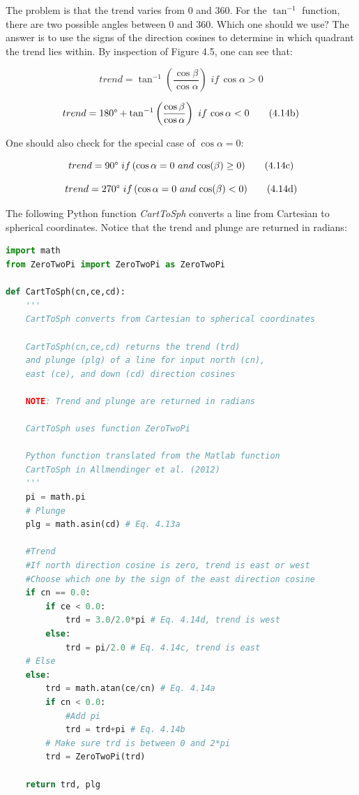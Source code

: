 \documentclass[a4paper , 12pt]{book}
\begin{document}
The problem is that the trend varies from 0 and 360\degree. For the $\tan^{-1}$ function, there are two possible angles between 0 and 360\degree. Which one should we use? The answer is to use the signs of the direction cosines to determine in which quadrant the trend lies within. By inspection of Figure 4.5, one can see that:

\begin{equation}
    trend = \tan^{-1}\left(\frac{\cos\beta}{\cos\alpha}\right)\,\,if\,\cos\alpha>0 \tag{4.14a}
\end{equation}

\begin{equation}
    trend = 180\degree+\tan^{-1}\left(\frac{\cos\beta}{\cos\alpha}\right)\,\,if\,\cos\alpha<0 \tag{4.14b}
\end{equation}

One should also check for the special case of $\cos\alpha=0$:

\begin{equation}
    trend = 90\degree\,\,if\,(\cos\alpha = 0\,\,and\,\cos(\beta)\geq 0) \tag{4.14c}
\end{equation}

\begin{equation}
    trend = 270\degree\,\,if\,(\cos\alpha = 0\,\,and\,\cos(\beta)< 0) \tag{4.14d}
\end{equation}

The following Python function \textit{CartToSph} converts a line from Cartesian to spherical coordinates. Notice that the trend and plunge are returned in radians:

\begin{center}
\begin{lstlisting}[language=Python, frame=single]
import math
from ZeroTwoPi import ZeroTwoPi as ZeroTwoPi

def CartToSph(cn,ce,cd):
    '''
    CartToSph converts from Cartesian to spherical coordinates 

    CartToSph(cn,ce,cd) returns the trend (trd)
    and plunge (plg) of a line for input north (cn), 
    east (ce), and down (cd) direction cosines

    NOTE: Trend and plunge are returned in radians

    CartToSph uses function ZeroTwoPi
    
    Python function translated from the Matlab function 
    CartToSph in Allmendinger et al. (2012)
    '''
    pi = math.pi
    # Plunge 
    plg = math.asin(cd) # Eq. 4.13a
    
    #Trend
    #If north direction cosine is zero, trend is east or west
    #Choose which one by the sign of the east direction cosine
    if cn == 0.0:
        if ce < 0.0:
            trd = 3.0/2.0*pi # Eq. 4.14d, trend is west
        else:
            trd = pi/2.0 # Eq. 4.14c, trend is east
    # Else
    else:
        trd = math.atan(ce/cn) # Eq. 4.14a
        if cn < 0.0:
            #Add pi 
            trd = trd+pi # Eq. 4.14b
        # Make sure trd is between 0 and 2*pi
        trd = ZeroTwoPi(trd)
    
    return trd, plg
\end{lstlisting}    
\end{center}
\end{document}
